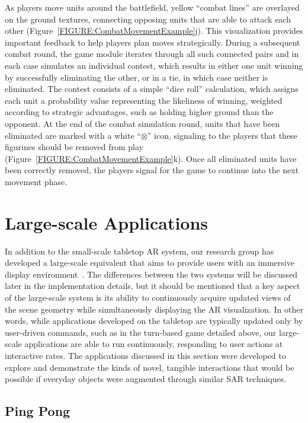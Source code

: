 \documentclass{thesis}
\begin{document}
As players move units around the battlefield, yellow ``combat lines'' are overlayed on the ground textures, connecting opposing units that are able to attack each other (Figure~\ref{FIGURE:CombatMovementExample}j). This visualization provides important feedback to help players plan moves strategically. During a subsequent combat round, the game module iterates through all such connected pairs and in each case simulates an individual contest, which results in either one unit winning by successfully eliminating the other, or in a tie, in which case neither is eliminated. The contest consists of a simple ``dice roll'' calculation, which assigns each unit a probability value representing the likeliness of winning, weighted according to strategic advantages, such as holding higher ground than the opponent. At the end of the combat simulation round, units that have been eliminated are marked with a white ``\begin{math} \otimes\end{math}'' icon, signaling to the players that these figurines should be removed from play (Figure~\ref{FIGURE:CombatMovementExample}k). Once all eliminated units have been correctly removed, the players signal for the game to continue into the next movement phase.

\section{Large-scale Applications }

In addition to the small-scale tabletop AR system, our research group has developed a large-scale equivalent that aims to provide users with an immersive display environment~\cite{Yapo2010}. The differences between the two systems will be discussed later in the implementation details, but it should be mentioned that a key aspect of the large-scale system is its ability to continuously acquire updated views of the scene geometry while simultaneously displaying the AR visualization. In other words, while applications developed on the tabletop are typically updated only by user-driven commands, such as in the turn-based game detailed above, our large-scale applications are able to run continuously, responding to user actions at interactive rates. The applications discussed in this section were developed to explore and demonstrate the kinds of novel, tangible interactions that would be possible if everyday objects were augmented through similar SAR techniques.

\subsection { Ping Pong }
\end{document}
